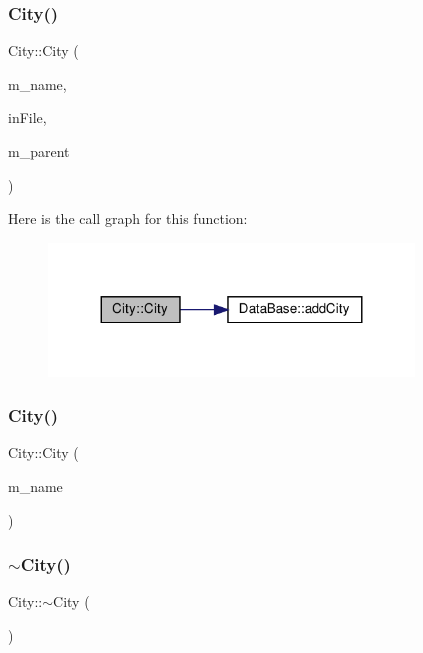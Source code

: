 \subsubsection{\texorpdfstring{City()}{City()}\hspace{0.1cm}{\footnotesize\ttfamily [1/2]}}
{\footnotesize\ttfamily City\+::\+City (\begin{DoxyParamCaption}\item[{string}]{m\+\_\+name,  }\item[{ifstream \&}]{in\+File,  }\item[{\hyperlink{class_data_base}{Data\+Base} $\ast$}]{m\+\_\+parent }\end{DoxyParamCaption})}

Here is the call graph for this function\+:\nopagebreak
\begin{figure}[H]
\begin{center}
\leavevmode
\includegraphics[width=275pt]{class_city_ac0f0f98a4b34f6035ce375b249ea1f6f_cgraph}
\end{center}
\end{figure}
\mbox{\label{class_city_a32fffd38b77f72bf8ffdced4db06db41}} 
\subsubsection{\texorpdfstring{City()}{City()}\hspace{0.1cm}{\footnotesize\ttfamily [2/2]}}
{\footnotesize\ttfamily City\+::\+City (\begin{DoxyParamCaption}\item[{string}]{m\+\_\+name }\end{DoxyParamCaption})\hspace{0.3cm}{\ttfamily [inline]}}

\mbox{\label{class_city_ae95feee8a1d4e1f14ea41ec89b47304f}} 
\subsubsection{\texorpdfstring{$\sim$\+City()}{~City()}}
{\footnotesize\ttfamily City\+::$\sim$\+City (\begin{DoxyParamCaption}{ }\end{DoxyParamCaption})\hspace{0.3cm}{\ttfamily [inline]}}



